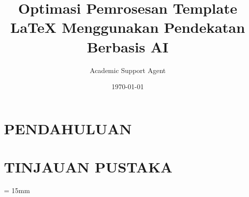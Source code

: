 \documentclass{report}
\title{Optimasi Pemrosesan Template LaTeX Menggunakan Pendekatan Berbasis AI}
\author{Academic Support Agent}
\date{\today}
\begin{document}
\maketitle

\begin{abstract}

\end{abstract}

\chapter{PENDAHULUAN}


\chapter{TINJAUAN PUSTAKA}


\usepackage[utf8]{inputenc}
\usepackage{graphicx}
\usepackage{wrapfig}
\usepackage[a4paper, width=150mm, top=25mm, bottom=30mm, bindingoffset=0mm]{geometry}
\usepackage[titletoc, title,header]{appendix}
\usepackage{pdfpages}
\usepackage{natbib}
\usepackage{dirtytalk}
\usepackage{pdflscape}
\usepackage{longtable}
\usepackage{multirow}
\usepackage{textcomp}
\usepackage{fancyhdr}
\usepackage{fancybox}
\usepackage{tikz}
\usepackage{helvet}
\usepackage{hyphenat}
\usepackage[hidelinks]{hyperref}
\renewcommand{\familydefault}{\sfdefault}
\def\checkmark{\tikz\fill[scale=0.4](0,.35) -- (.25,0) -- (1,.7) -- (.25,.15) -- cycle;} 
\pagestyle{fancy}
\setlength{\headheight}{13.6pt}
\linespread{1.5}

\graphicspath{ {images/}{appendices/} }
\footskip = 15mm
\usepackage{titlesec}
\titleformat{\chapter}[hang]
	{\normalfont\Huge\bfseries}{\thechapter\quad}{0pt}{\Huge}
\titlespacing*{\chapter}{0pt}{0pt}{20pt}
\end{document}
